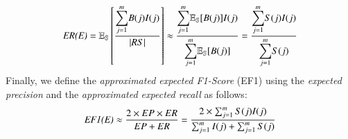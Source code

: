 \begin{equation}
   \emph{ER(E)}=\mathbb{E_{S}}\left[\dfrac{{\displaystyle \sum_{j=1}^{m}}B(j)I(j)}{|RS|}\right]\approx\dfrac{{\displaystyle \sum_{j=1}^{m}}\mathbb{E_{S}}[B(j)]I(j)}{{\displaystyle \sum_{j=1}^{m}}\mathbb{E_{S}}[B(j)]}=\dfrac{{\displaystyle \sum_{j=1}^{m}}S(j)I(j)}{{\displaystyle \sum_{j=1}^{m}}S(j)}
\end{equation}
Finally, we define the \emph{approximated expected F1-Score} (EF1) using the \emph{expected precision} and the \emph{approximated expected recall} as follows: 
\begin{align}
    \emph{EF1(E)}  \approx \dfrac{2\times EP\times ER}{EP+ER} = \dfrac{2\times\sum_{j=1}^m S(j)I(j)}{\sum_{j=1}^m I(j) + \sum_{j=1}^m S(j)}
    \label{eq:EF1}
\end{align}
  









